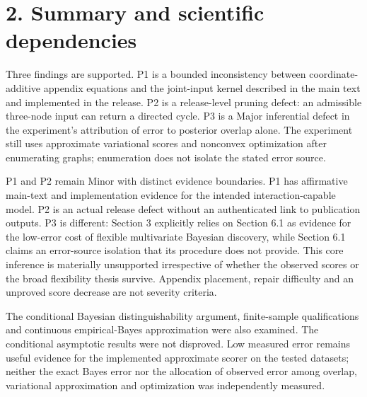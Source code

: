 \documentclass[10pt]{article}
\begin{document}
\section*{2. Summary and scientific dependencies}
Three findings are supported. P1 is a bounded inconsistency between coordinate-additive appendix equations and the joint-input kernel described in the main text and implemented in the release. P2 is a release-level pruning defect: an admissible three-node input can return a directed cycle. P3 is a Major inferential defect in the experiment’s attribution of error to posterior overlap alone. The experiment still uses approximate variational scores and nonconvex optimization after enumerating graphs; enumeration does not isolate the stated error source.\par
P1 and P2 remain Minor with distinct evidence boundaries. P1 has affirmative main-text and implementation evidence for the intended interaction-capable model. P2 is an actual release defect without an authenticated link to publication outputs. P3 is different: Section 3 explicitly relies on Section 6.1 as evidence for the low-error cost of flexible multivariate Bayesian discovery, while Section 6.1 claims an error-source isolation that its procedure does not provide. This core inference is materially unsupported irrespective of whether the observed scores or the broad flexibility thesis survive. Appendix placement, repair difficulty and an unproved score decrease are not severity criteria.\par
The conditional Bayesian distinguishability argument, finite-sample qualifications and continuous empirical-Bayes approximation were also examined. The conditional asymptotic results were not disproved. Low measured error remains useful evidence for the implemented approximate scorer on the tested datasets; neither the exact Bayes error nor the allocation of observed error among overlap, variational approximation and optimization was independently measured.\par
\end{document}
